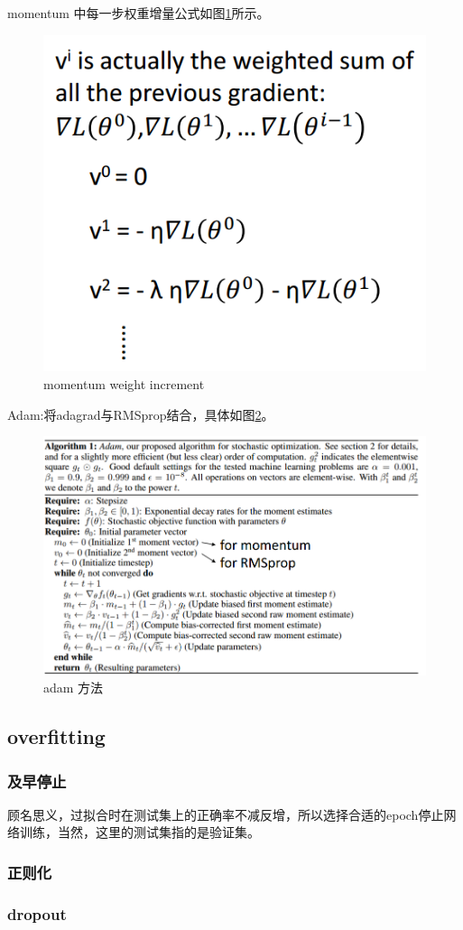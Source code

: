 momentum 中每一步权重增量公式如图\ref{fig:momentum_weight}所示。
\begin{figure}[htb]
	\centering
	\includegraphics[scale=0.4]{pic/momentum_weight}
	\caption{momentum weight increment}
	\label{fig:momentum_weight}
\end{figure}

Adam:将adagrad与RMSprop结合，具体如图\ref{fig:adam}。

\begin{figure}[htb]
	\centering
	\includegraphics[scale=0.6]{pic/adam}
	\caption{adam 方法}
	\label{fig:adam}
\end{figure}

\subsection{overfitting}

\subsubsection{及早停止}
顾名思义，过拟合时在测试集上的正确率不减反增，所以选择合适的epoch停止网络训练，当然，这里的测试集指的是验证集。
\subsubsection{正则化}

\subsubsection{dropout}
